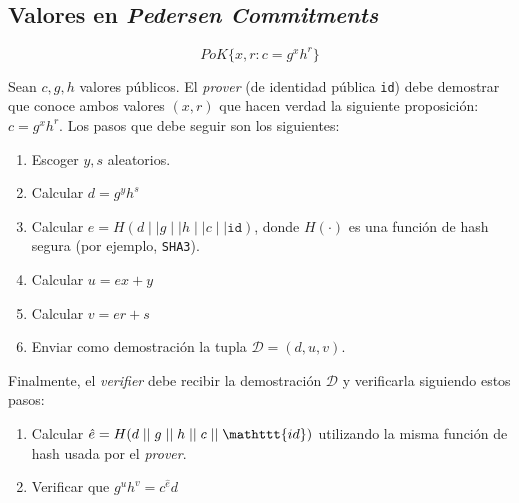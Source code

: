 \subsection{Valores en \emph{Pedersen Commitments}}

$$PoK\{x, r : c = g^x h^r\}$$

Sean $c, g, h$ valores públicos. El \emph{prover} (de identidad pública 
\texttt{id}) debe demostrar que conoce ambos valores $(x,r)$ que hacen verdad 
la siguiente proposición: $c = g^x h^r$. Los pasos que debe seguir son los 
siguientes:
\begin{enumerate}
	\item Escoger $y, s$ aleatorios.
	\item Calcular $d = g^y h^s$
	\item Calcular $e = H(d \mid\mid g \mid\mid h \mid\mid c \mid\mid \mathtt{id})$, donde $H(\cdot)$ es una función de hash segura (por ejemplo, \texttt{SHA3}).
	\item Calcular $u = ex + y$
	\item Calcular $v = er + s$
	\item Enviar como demostración la tupla $\mathcal{D} = (d, u, v)$.
\end{enumerate}

Finalmente, el \emph{verifier} debe recibir la demostración $\mathcal{D}$ y 
verificarla siguiendo estos pasos:
\begin{enumerate}
	\item Calcular $\hat{e} = H(d \mid\mid g \mid\mid h \mid\mid c \mid\mid \mathttt{id})$ utilizando la misma función de hash usada por el \emph{prover}.
	\item Verificar que $g^u h^v = c^\hat{e} d$
\end{enumerate}

